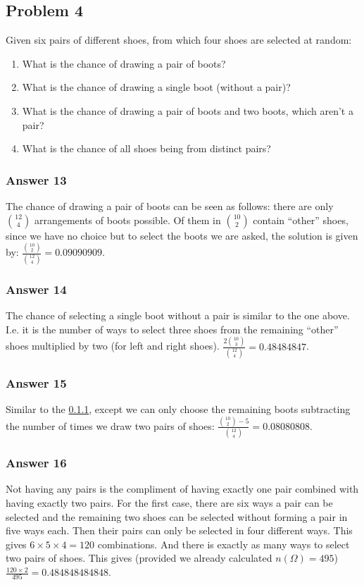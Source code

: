 \documentclass[11pt]{article}
\begin{document}
\subsection{Problem 4}
\label{sec-1-4}
Given six pairs of different shoes, from which four shoes are selected at
random:
\begin{enumerate}
\item What is the chance of drawing a pair of boots?
\item What is the chance of drawing a single boot (without a pair)?
\item What is the chance of drawing a pair of boots and two boots, which aren't
a pair?
\item What is the chance of all shoes being from distinct pairs?
\end{enumerate}

\subsubsection{Answer 13}
\label{sec-1-4-1}
The chance of drawing a pair of boots can be seen as follows: there are
only $\binom{12}{4}$ arrangements of boots possible.  Of them in 
$\binom{10}{2}$ contain ``other'' shoes, since we have no choice but to
select the boots we are asked, the solution is given by:
$\frac{\binom{10}{2}}{\binom{12}{4}} = \num{0.09090909}$.
\subsubsection{Answer 14}
\label{sec-1-4-2}
The chance of selecting a single boot without a pair is similar to the one
above. I.e. it is the number of ways to select three shoes from the remaining
``other'' shoes multiplied by two (for left and right shoes).
$\frac{2\binom{10}{3}}{\binom{12}{4}} = \num{0.48484847}$.
\subsubsection{Answer 15}
\label{sec-1-4-3}
Similar to the \ref{sec-1-4-1}, except we can only choose the remaining boots
subtracting the number of times we draw two pairs of shoes:
$\frac{\binom{10}{2} - 5}{\binom{12}{4}} = \num{0.08080808}$.
\subsubsection{Answer 16}
\label{sec-1-4-4}
Not having any pairs is the compliment of having exactly one pair 
combined with having exactly two pairs.  For the first case, there
are six ways a pair can be selected and the remaining two shoes can
be selected without forming a pair in five ways each.  Then their
pairs can only be selected in four different ways.  This gives
$6 \times 5 \times 4 = 120$ combinations.  And there is exactly
as many ways to select two pairs of shoes.  This gives (provided
we already calculated $n(\Omega) = 495$)
$\frac{120 \times 2}{495} = \num{0.484848484848}$.
\end{document}
